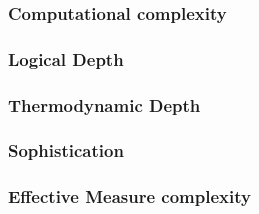 \subsubsection{Computational complexity}

\subsubsection{Logical Depth}

\subsubsection{Thermodynamic Depth}

\subsubsection{Sophistication}

\subsubsection{Effective Measure complexity}
